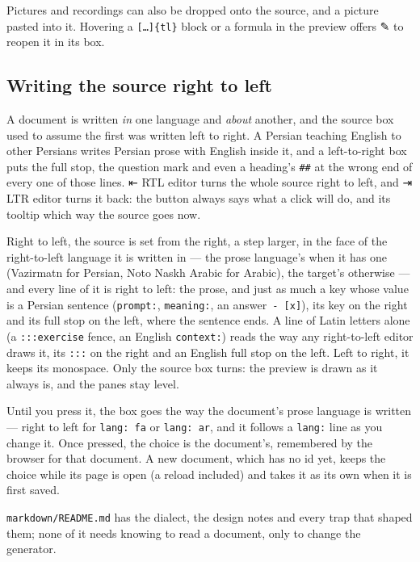 \documentclass[11pt,oneside]{report}
\newcommand{\sym}[1]{{\symfont #1}}
\newcommand{\file}[1]{\texttt{#1}}
\newcommand{\menu}[1]{\textsf{#1}}
\begin{document}
\noindent Pictures and recordings can also be dropped onto the source, and a
picture pasted into it. Hovering a \texttt{[\ldots]\{tl\}} block or a formula
in the preview offers \sym{✎} to reopen it in its box.

\subsection*{Writing the source right to left}

A document is written \emph{in} one language and \emph{about} another, and
the source box used to assume the first was written left to right. A Persian
teaching English to other Persians writes Persian prose with English inside
it, and a left-to-right box puts the full stop, the question mark and even a
heading's \texttt{\#\#} at the wrong end of every one of those lines.
\menu{\sym{⇤} RTL editor} turns the whole source right to left, and
\menu{\sym{⇥} LTR editor} turns it back: the button always says what a click
will do, and its tooltip which way the source goes now.

Right to left, the source is set from the right, a step larger, in the face
of the right-to-left language it is written in --- the prose language's when
it has one (Vazirmatn for Persian, Noto Naskh Arabic for Arabic), the
target's otherwise --- and every line of it is right to left: the prose, and
just as much a key whose value is a Persian sentence (\texttt{prompt:},
\texttt{meaning:}, an answer~\texttt{-~[x]}), its key on the right and its
full stop on the left, where the sentence ends. A line of Latin letters alone
(a \texttt{:::exercise} fence, an English \texttt{context:}) reads the way
any right-to-left editor draws it, its \texttt{:::} on the right and an
English full stop on the left. Left to right, it keeps its monospace. Only
the source box turns: the preview is drawn as it always is, and the panes
stay level.

Until you press it, the box goes the way the document's prose language is
written --- right to left for \texttt{lang: fa} or \texttt{lang: ar}, and it
follows a \texttt{lang:} line as you change it. Once pressed, the choice is
the document's, remembered by the browser for that document. A new document,
which has no id yet, keeps the choice while its page is open (a reload
included) and takes it as its own when it is first saved.

\file{markdown/README.md} has the dialect, the design notes and every trap
that shaped them; none of it needs knowing to read a document, only to change
the generator.
\end{document}
